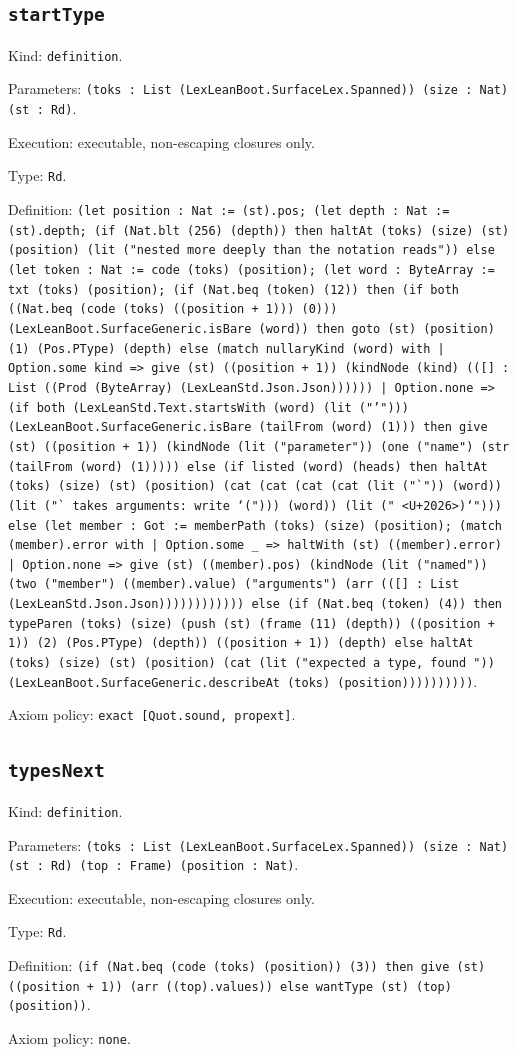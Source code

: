 \documentclass[11pt]{article}
\begin{document}
\subsection*{\texttt{startType}}
\noindent Kind: \texttt{definition}.\par
\noindent Parameters: \texttt{(toks : List (LexLeanBoot.SurfaceLex.Spanned)) (size : Nat) (st : Rd)}.\par
\noindent Execution: executable, non-escaping closures only.\par
\noindent Type: \texttt{Rd}.\par
\noindent Definition: \texttt{(let position : Nat := (st).pos; (let depth : Nat := (st).depth; (if (Nat.blt (256) (depth)) then haltAt (toks) (size) (st) (position) (lit ("nested more deeply than the notation reads")) else (let token : Nat := code (toks) (position); (let word : ByteArray := txt (toks) (position); (if (Nat.beq (token) (12)) then (if both ((Nat.beq (code (toks) ((position + 1))) (0))) (LexLeanBoot.SurfaceGeneric.isBare (word)) then goto (st) (position) (1) (Pos.PType) (depth) else (match nullaryKind (word) with | Option.some kind => give (st) ((position + 1)) (kindNode (kind) (([] : List ((Prod (ByteArray) (LexLeanStd.Json.Json)))))) | Option.none => (if both (LexLeanStd.Text.startsWith (word) (lit ("'"))) (LexLeanBoot.SurfaceGeneric.isBare (tailFrom (word) (1))) then give (st) ((position + 1)) (kindNode (lit ("parameter")) (one ("name") (str (tailFrom (word) (1))))) else (if listed (word) (heads) then haltAt (toks) (size) (st) (position) (cat (cat (cat (cat (lit ("`")) (word)) (lit ("` takes arguments: write `("))) (word)) (lit (" <U+2026>)`"))) else (let member : Got := memberPath (toks) (size) (position); (match (member).error with | Option.some \_ => haltWith (st) ((member).error) | Option.none => give (st) ((member).pos) (kindNode (lit ("named")) (two ("member") ((member).value) ("arguments") (arr (([] : List (LexLeanStd.Json.Json)))))))))))) else (if (Nat.beq (token) (4)) then typeParen (toks) (size) (push (st) (frame (11) (depth)) ((position + 1)) (2) (Pos.PType) (depth)) ((position + 1)) (depth) else haltAt (toks) (size) (st) (position) (cat (lit ("expected a type, found ")) (LexLeanBoot.SurfaceGeneric.describeAt (toks) (position))))))))))}.\par
\noindent Axiom policy: \texttt{exact [Quot.sound, propext]}.\par
\subsection*{\texttt{typesNext}}
\noindent Kind: \texttt{definition}.\par
\noindent Parameters: \texttt{(toks : List (LexLeanBoot.SurfaceLex.Spanned)) (size : Nat) (st : Rd) (top : Frame) (position : Nat)}.\par
\noindent Execution: executable, non-escaping closures only.\par
\noindent Type: \texttt{Rd}.\par
\noindent Definition: \texttt{(if (Nat.beq (code (toks) (position)) (3)) then give (st) ((position + 1)) (arr ((top).values)) else wantType (st) (top) (position))}.\par
\noindent Axiom policy: \texttt{none}.\par
\end{document}
